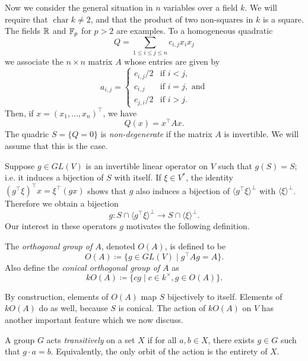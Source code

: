 Now we consider the general situation in $n$ variables over a field $k$. We will require that $\operatorname{char} k \neq 2$, and that the product of two non-squares in $k$ is a square. The fields $\mathbb{R}$ and $\mathbb{F}_p$ for $p>2$ are examples. To a homogeneous quadratic
\[
	Q = \sum_{1 \leq i \leq j \leq n} c_{i,j} x_i x_j 
\]
we associate the $n\times n$ matrix $A$ whose entries are given by
\[
	a_{i,j} = \begin{cases}
		{c_{i,j}}/{2} & \text{if } i < j,\\
		c_{i,j} & \text{if } i = j, \text{ and}\\
		{c_{j,i}}/{2} & \text{if } i > j.
	\end{cases}
\]
Then, if $x = (x_1,\ldots,x_n)^\top$, we have
\[
	Q(x) = x^\top A x.
\]
The quadric $S = \{Q = 0\}$ is \emph{non-degenerate} if the matrix $A$ is invertible. We will assume that this is the case.

Suppose $g \in GL(V)$ is an invertible linear operator on $V$ such that $g(S) = S$; i.e. it induces a bijection of $S$ with itself. If $\xi \in V^*$, the identity $(g^\top \xi)^\top x = \xi^\top (gx)$ shows that $g$ also induces a bijection of $\langle g^\top \xi \rangle^\bot$ with $\langle \xi \rangle^\bot$. Therefore we obtain a bijection
\begin{equation}\label{eq:S-operator-hyperplane-bijection}
	g\colon S \cap \langle g^\top \xi \rangle^\bot \to S \cap \langle \xi \rangle^\bot.
\end{equation}
Our interest in these operators $g$ motivates the following definition.
\begin{defn}
	The \emph{orthogonal group of $A$}, denoted $O(A)$, is defined to be
	\[
		O(A) \coloneqq \{ g \in GL(V) \mid g^\top A g = A\}.
	\]
	Also define the \emph{conical orthogonal group of $A$} as
	\[
		kO(A) \coloneqq \{ cg \mid c\in k^\times, g\in O(A)\}.
	\]
\end{defn}
By construction, elements of $O(A)$ map $S$ bijectively to itself. Elements of $kO(A)$ do as well, because $S$ is conical. The action of $kO(A)$ on $V$ has another important feature which we now discuss. 
\begin{defn}
	A group $G$ acts \emph{transitively} on a set $X$ if for all $a,b\in X$, there exists $g\in G$ such that $g\cdot a = b$. Equivalently, the only orbit of the action is the entirety of $X$.
\end{defn}

